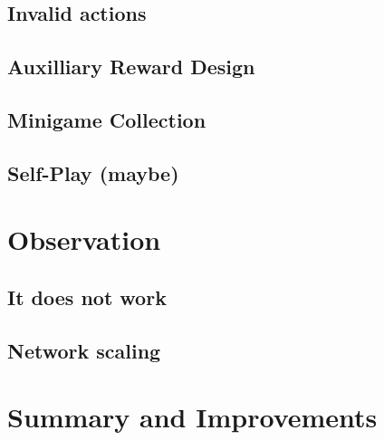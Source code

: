 \documentclass[12pt]{article}
\begin{document}
\subsection{Invalid actions} %
\subsection{Auxilliary Reward Design}
\subsection{Minigame Collection} %
\subsection{Self-Play (maybe)}

\section{Observation}
\subsection{It does not work}
\subsection{Network scaling} %



\section{Summary and Improvements}

\end{document}

